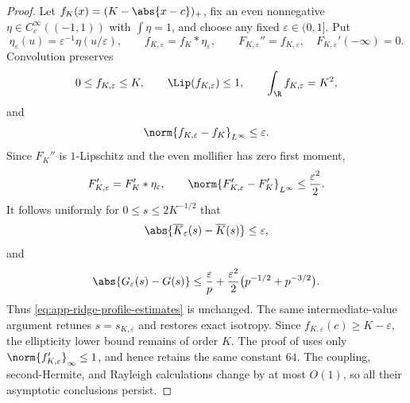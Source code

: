 \begin{proof}
Let \(f_K(x)=(K-\abs{x-c})_+\), fix an even nonnegative
\(\eta\in C_c^\infty((-1,1))\) with \(\int\eta=1\), and choose any fixed
\(\varepsilon\in(0,1]\).  Put
\[
  \eta_\varepsilon(u)=\varepsilon^{-1}\eta(u/\varepsilon),
  \qquad
  f_{K,\varepsilon}=f_K*\eta_\varepsilon,
  \qquad
  F_{K,\varepsilon}''=f_{K,\varepsilon},
  \quad F_{K,\varepsilon}'(-\infty)=0.
\]
Convolution preserves
\[
  0\leq f_{K,\varepsilon}\leq K,\qquad
  \Lip(f_{K,\varepsilon})\leq1,\qquad
  \int_\R f_{K,\varepsilon}=K^2,
\]
and
\[
  \norm{f_{K,\varepsilon}-f_K}_{L^\infty}\leq\varepsilon.
\]
Since \(F_K''\) is \(1\)-Lipschitz and the even mollifier has zero first
moment,
\[
  F_{K,\varepsilon}'=F_K'*\eta_\varepsilon,\qquad
  \norm{F_{K,\varepsilon}'-F_K'}_{L^\infty}
  \leq\frac{\varepsilon^2}{2}.
\]
It follows uniformly for \(0\leq s\leq2K^{-1/2}\) that
\[
  \abs{\overline K_\varepsilon(s)-\overline K(s)}\leq\varepsilon,
\]
and
\[
  \abs{G_\varepsilon(s)-G(s)}
  \leq
  \frac{\varepsilon}{p}
  +\frac{\varepsilon^2}{2}
    \bigl(p^{-1/2}+p^{-3/2}\bigr).
\]
Thus \eqref{eq:app-ridge-profile-estimates} is unchanged.  The same
intermediate-value argument retunes \(s=s_{K,\varepsilon}\) and restores
exact isotropy.  Since \(f_{K,\varepsilon}(c)\geq K-\varepsilon\), the
ellipticity lower bound remains of order \(K\).  The proof of
 uses only
\(\norm{f_{K,\varepsilon}'}_\infty\leq1\), and hence retains the same
constant \(64\).  The coupling, second-Hermite, and Rayleigh calculations
change by at most \(O(1)\), so all their asymptotic conclusions persist.
\end{proof}

